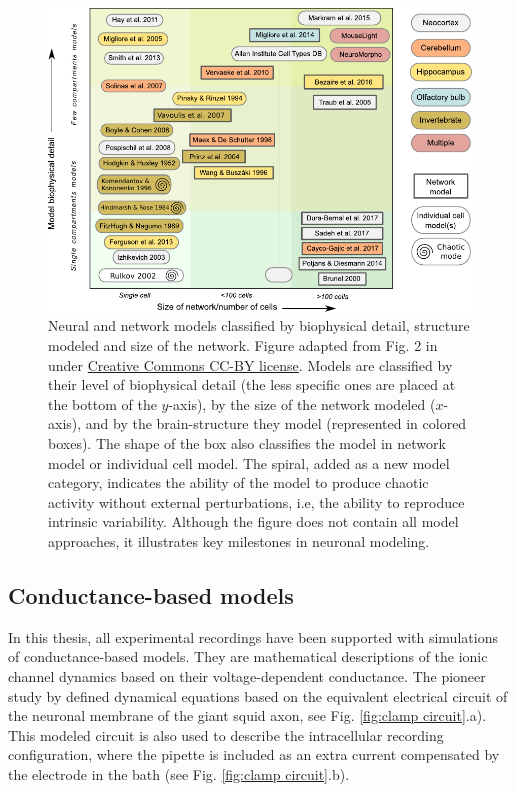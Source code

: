 \begin{figure}[bth!]
	\centering
	\includegraphics[width=\textwidth]{img/intro/models classification_v2.pdf}
	\caption{Neural and network models classified by biophysical detail, structure modeled and size of the network. Figure adapted from Fig. 2 in \textcite{gleeson_open_2019} under \href{http://creativecommons.org/licenses/by/4.0/}{Creative Commons CC-BY license}. Models are classified by their level of biophysical detail (the less specific ones are placed at the bottom of the  $y$-axis), by the size of the network modeled ($x$-axis),  and by the brain-structure they model (represented in colored boxes). The shape of the box also classifies the model in network model or individual cell model. The spiral, added as a new model category, indicates the ability of the model to produce chaotic activity without external perturbations, i.e, the ability to reproduce intrinsic variability. Although the figure does not contain all model approaches, it illustrates key milestones in neuronal modeling. }
	\label{fig:models-classification}
\end{figure}
\subsection{Conductance-based models}

In this thesis, all experimental recordings have been supported with simulations of conductance-based models. They are  mathematical descriptions of the ionic channel dynamics based on their voltage-dependent conductance. The pioneer study by \textcite{hodgkin_quantitative_1952} defined dynamical equations based on the equivalent electrical circuit of the neuronal membrane of the giant squid axon, see Fig. \ref{fig:clamp circuit}.a). This modeled circuit is also used to describe the intracellular recording configuration, where the pipette is included as an extra current compensated by the electrode in the bath (see Fig. \ref{fig:clamp circuit}.b).


